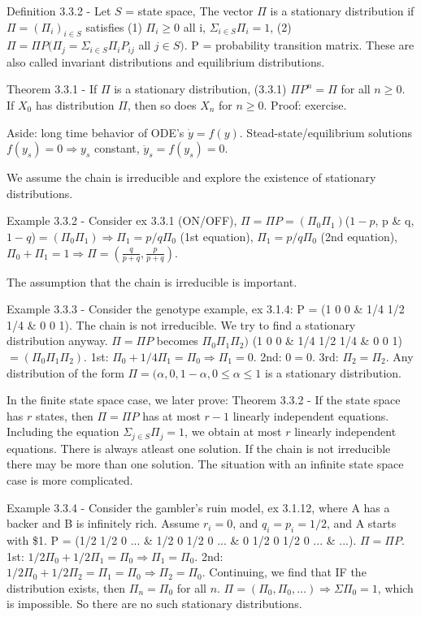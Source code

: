 \documentclass{article}
\begin{document}
Definition 3.3.2 - Let $S$ = state space, The vector $\Pi$ is a stationary distribution if $\Pi = (\Pi_i)_{i \in S}$ satisfies (1) $\Pi_i \ge 0$ all i, $\Sigma_{i \in S} \Pi_i = 1$, (2) $\Pi = \Pi P(\Pi_j = \Sigma_{i \in S} \Pi_i P_{ij}$ all $j \in S)$. P = probability transition matrix. These are also called invariant distributions and equilibrium distributions.

Theorem 3.3.1 - If $\Pi$ is a stationary distribution, (3.3.1) $\Pi P^n = \Pi$ for all $n \ge 0$. If $X_0$ has distribution $\Pi$, then so does $X_n$ for $n \ge 0$. Proof: exercise.

Aside: long time behavior of ODE's $\dot y = f(y)$. Stead-state/equilibrium solutions $f(y_s) = 0 \Rightarrow y_s $ constant, $\dot y_s = f(y_s) = 0$.

We assume the chain is irreducible and explore the existence of stationary distributions.

Example 3.3.2 - Consider ex 3.3.1 (ON/OFF), $\Pi = \Pi P = (\Pi_0 \Pi_1) $($1-p$, p \& q, $1-q$)$ = (\Pi_0 \Pi_1) \Rightarrow \Pi_1 = p/q \Pi_0$ (1st equation), $\Pi_1 = p/q \Pi_0$ (2nd equation), $\Pi_0 + \Pi_1 = 1 \Rightarrow \Pi = (\frac{q}{p+q}, \frac{p}{p+q})$.

The assumption that the chain is irreducible is important.

Example 3.3.3 - Consider the genotype example, ex 3.1.4: P = (1 0 0 \& 1/4 1/2 1/4 \& 0 0 1). The chain is not irreducible. We try to find a stationary distribution anyway. $\Pi = \Pi P$ becomes $\Pi_0 \Pi_1 \Pi_2)$ (1 0 0 \& 1/4 1/2 1/4 \& 0 0 1)$ = (\Pi_0 \Pi_1 \Pi_2)$. 1st: $\Pi_0 + 1/4 \Pi_1 = \Pi_0 \Rightarrow \Pi_1 = 0$. 2nd: $0 = 0$. 3rd: $\Pi_2 = \Pi_2$. Any distribution of the form $\Pi = (\alpha, 0, 1-\alpha, 0 \le \alpha \le 1$ is a stationary distribution.

In the finite state space case, we later prove:
Theorem 3.3.2 - If the state space has $r$ states, then $\Pi = \Pi P$ has at most $r-1$ linearly independent equations. Including the equation $\Sigma_{j \in S} \Pi_j = 1$, we obtain at most $r$ linearly independent equations. There is always atleast one solution. If the chain is not irreducible there may be more than one solution. The situation with an infinite state space case is more complicated.

Example 3.3.4 - Consider the gambler's ruin model, ex 3.1.12, where A has a backer and B is infinitely rich. Assume $r_i = 0$, and $q_i = p_i = 1/2$, and A starts with \$1. P = (1/2 1/2 0 ... \& 1/2 0 1/2 0 ... \& 0 1/2 0 1/2 0 ... \& ...). $\Pi = \Pi P$. 1st: $1/2 \Pi_0 + 1/2 \Pi_1 = \Pi_0 \Rightarrow \Pi_1 = \Pi_0$. 2nd: $1/2 \Pi_0 + 1/2 \Pi_2 = \Pi_1 = \Pi_0 \Rightarrow \Pi_2 = \Pi_0$. Continuing, we find that IF the distribution exists, then $\Pi_n = \Pi_0$ for all $n$. $\Pi = (\Pi_0, \Pi_0, \dots) \Rightarrow \Sigma \Pi_0 = 1$, which is impossible. So there are no such stationary distributions.
\end{document}
